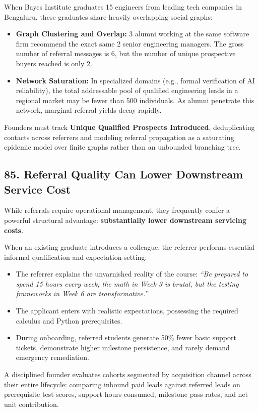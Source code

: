 When Bayes Institute graduates 15 engineers from leading tech companies in Bengaluru, these graduates share heavily overlapping social graphs:
\begin{itemize}[leftmargin=*]
\item \textbf{Graph Clustering and Overlap:} 3 alumni working at the same software firm recommend the exact same 2 senior engineering managers. The gross number of referral messages is 6, but the number of unique prospective buyers reached is only 2.
\item \textbf{Network Saturation:} In specialized domains (e.g., formal verification of AI reliability), the total addressable pool of qualified engineering leads in a regional market may be fewer than 500 individuals. As alumni penetrate this network, marginal referral yields decay rapidly.
\end{itemize}

Founders must track \textbf{Unique Qualified Prospects Introduced}, deduplicating contacts across referrers and modeling referral propagation as a saturating epidemic model over finite graphs rather than an unbounded branching tree.

\subsection*{85. Referral Quality Can Lower Downstream Service Cost}

While referrals require operational management, they frequently confer a powerful structural advantage: \textbf{substantially lower downstream servicing costs}.

When an existing graduate introduces a colleague, the referrer performs essential informal qualification and expectation-setting:
\begin{itemize}[leftmargin=*]
\item The referrer explains the unvarnished reality of the course: \textit{``Be prepared to spend 15 hours every week; the math in Week 3 is brutal, but the testing frameworks in Week 6 are transformative.''}
\item The applicant enters with realistic expectations, possessing the required calculus and Python prerequisites.
\item During onboarding, referred students generate 50\% fewer basic support tickets, demonstrate higher milestone persistence, and rarely demand emergency remediation.
\end{itemize}

A disciplined founder evaluates cohorts segmented by acquisition channel across their entire lifecycle: comparing inbound paid leads against referred leads on prerequisite test scores, support hours consumed, milestone pass rates, and net unit contribution.

